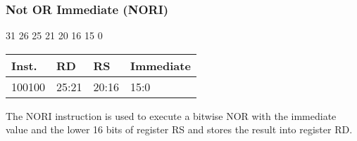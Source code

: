 \documentclass[12pt]{article}
\begin{document}

    \newpage
    \subsubsection{Not OR Immediate (NORI)}
    
    \hspace{1.6cm}31 \hspace{1.15cm}26 \hspace{.05cm}25 \hspace{.8cm}21 \hspace{.05cm}20 \hspace{.8cm}16 \hspace{.05cm}15 \hspace{6.4cm}0
    \vspace{-.25cm}
    \begin{center}
        \begin{tabular}{ |p{1.8cm}|p{1.5cm}|p{1.5cm}|p{6.8cm}| }
            \hline
            \textbf{Inst.} & \textbf{RD} &  \textbf{RS} & \textbf{Immediate}\\
            \hline
            100100& 25:21 & 20:16 &15:0\\
            \hline
        \end{tabular}
    \end{center}
    
    \noindent
    The NORI instruction is used to execute a bitwise NOR with the immediate value and the lower 16 bits of register RS and stores the result into register RD. 
    
\end{document}
